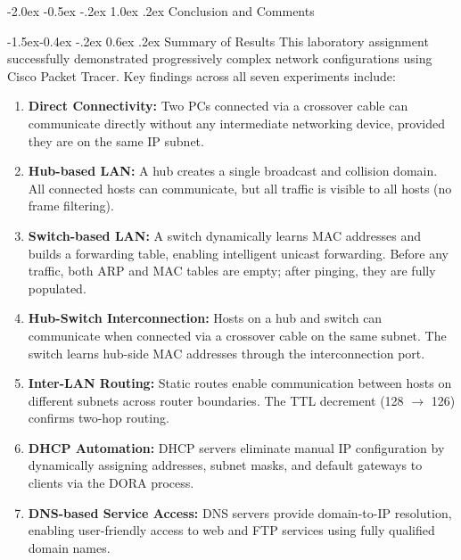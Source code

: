 \documentclass[11pt,a4paper]{article}
\makeatletter
\renewcommand\section{\@startsection {section}{1}{\z@}%
  {-2.0ex \@plus -0.5ex \@minus -.2ex}%
  {1.0ex \@plus .2ex}%
  {\normalfont\Large\bfseries}}
\renewcommand\subsection{\@startsection{subsection}{2}{\z@}%
  {-1.5ex\@plus -0.4ex \@minus -.2ex}%
  {0.6ex \@plus .2ex}%
  {\normalfont\large\bfseries}}
\makeatother
\begin{document}
\section{Conclusion and Comments}

\subsection{Summary of Results}
This laboratory assignment successfully demonstrated progressively complex network configurations using Cisco Packet Tracer. Key findings across all seven experiments include:
\begin{enumerate}
  \item \textbf{Direct Connectivity:} Two PCs connected via a crossover cable can communicate directly without any intermediate networking device, provided they are on the same IP subnet.
  \item \textbf{Hub-based LAN:} A hub creates a single broadcast and collision domain. All connected hosts can communicate, but all traffic is visible to all hosts (no frame filtering).
  \item \textbf{Switch-based LAN:} A switch dynamically learns MAC addresses and builds a forwarding table, enabling intelligent unicast forwarding. Before any traffic, both ARP and MAC tables are empty; after pinging, they are fully populated.
  \item \textbf{Hub-Switch Interconnection:} Hosts on a hub and switch can communicate when connected via a crossover cable on the same subnet. The switch learns hub-side MAC addresses through the interconnection port.
  \item \textbf{Inter-LAN Routing:} Static routes enable communication between hosts on different subnets across router boundaries. The TTL decrement (128 $\rightarrow$ 126) confirms two-hop routing.
  \item \textbf{DHCP Automation:} DHCP servers eliminate manual IP configuration by dynamically assigning addresses, subnet masks, and default gateways to clients via the DORA process.
  \item \textbf{DNS-based Service Access:} DNS servers provide domain-to-IP resolution, enabling user-friendly access to web and FTP services using fully qualified domain names.
\end{enumerate}
\end{document}

